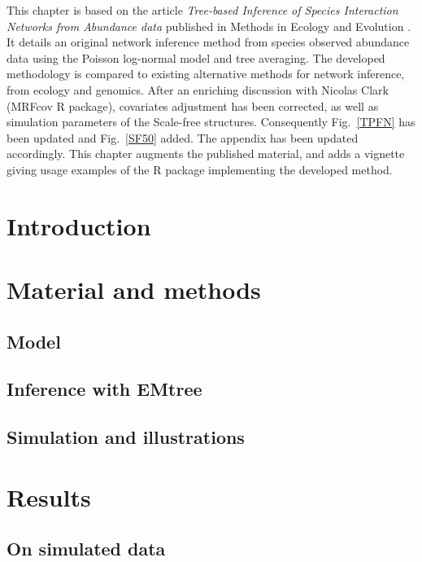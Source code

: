 
\vspace{0.5cm}
This chapter is based on the article \textit{Tree-based Inference of Species Interaction Networks from Abundance data} published in Methods in Ecology and Evolution \citep{MRA20}. It details an original network inference method from species observed abundance data using the Poisson log-normal model and tree averaging. The developed methodology is compared to existing alternative methods for network inference, from ecology and genomics. After an enriching discussion with Nicolas Clark (MRFcov R package), covariates adjustment has been corrected, as well as simulation parameters of the Scale-free structures. Consequently Fig.~\ref{TPFN} has been updated and Fig.~\ref{SF50}  added. The appendix has been updated accordingly. This chapter augments the published material, and adds a vignette giving usage examples of the R package implementing the developed method.


\section{Introduction}

%

\section{Material and methods}
\subsection{Model} \label{sec:model} 
\subsection{Inference with EMtree} \label{sec:inference} 
\subsection{Simulation and illustrations} 
 
\section{Results}
\subsection{On simulated data}  \label{sec:simul}
